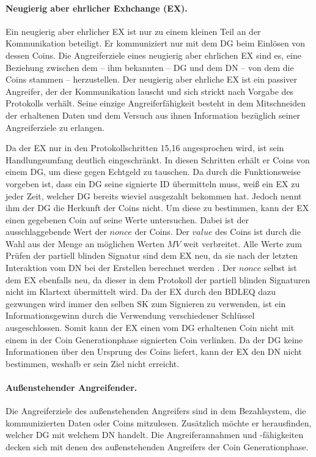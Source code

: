 \documentclass[
	fontsize=11pt,
	headings=small,
	parskip=half,           %
	bibliography=totoc,
	numbers=noenddot,       %
	open=any,               %
]{scrreprt}
\begin{document}
\paragraph{Neugierig aber ehrlicher Exhchange (EX).}
Ein neugierig aber ehrlicher EX ist nur zu einem kleinen Teil an der Kommunikation beteiligt. Er kommuniziert nur mit dem DG beim Einlösen von dessen Coins. Die Angreiferziele eines neugierig aber ehrlichen EX sind es, eine Beziehung zwischen dem -- ihm bekannten -- DG und dem DN -- von dem die Coins stammen -- herzustellen. Der neugierig aber ehrliche EX ist ein passiver Angreifer, der der Kommunikation lauscht und sich strickt nach Vorgabe des Protokolls verhält. Seine einzige Angreiferfähigkeit besteht in dem Mitschneiden der erhaltenen Daten und dem Versuch aus ihnen Information bezüglich seiner Angreiferziele zu erlangen.

Da der EX nur in den Protokollschritten 15,16 angesprochen wird, ist sein Handlungsumfang deutlich eingeschränkt. In diesen Schritten erhält er Coins von einem DG, um diese gegen Echtgeld zu tauschen. Da durch die Funktionsweise vorgeben ist, dass ein DG seine signierte ID übermitteln muss, weiß ein EX zu jeder Zeit, welcher DG bereits wieviel ausgezahlt bekommen hat. Jedoch nennt ihm der DG die Herkunft der Coins nicht. Um diese zu bestimmen, kann der EX einen gegebenen Coin auf seine Werte untersuchen. Dabei ist der ausschlaggebende Wert der $nonce$ der Coins. Der $value$ des Coins ist durch die Wahl aus der Menge an möglichen Werten $MV$ weit verbreitet. Alle Werte zum Prüfen der partiell blinden Signatur sind dem EX neu, da sie nach der letzten Interaktion vom DN bei der Erstellen berechnet werden \cite{abe2000provably}. Der $nonce$ selbst ist dem EX ebenfalls neu, da dieser in dem Protokoll der partiell blinden Signaturen nicht im Klartext übermittelt wird. Da der EX durch den BDLEQ dazu gezwungen wird immer den selben SK zum Signieren zu verwenden, ist ein Informationsgewinn durch die Verwendung verschiedener Schlüssel ausgeschlossen. Somit kann der EX einen vom DG erhaltenen Coin nicht mit einem in der Coin Generationphase signierten Coin verlinken. Da der DG keine Informationen über den Ursprung des Coins liefert, kann der EX den DN nicht bestimmen, weshalb er sein Ziel nicht erreicht. 

\paragraph{Außenstehender Angreifender.}
Die Angreiferziele des außenstehenden Angreifers sind in dem Bezahlsystem, die kommunizierten Daten oder Coins mitzulesen. Zusätzlich möchte er herausfinden, welcher DG mit welchem DN handelt. Die Angreiferannahmen und -fähigkeiten decken sich mit denen des außenstehenden Angreifers der Coin Generationphase.
\end{document}
